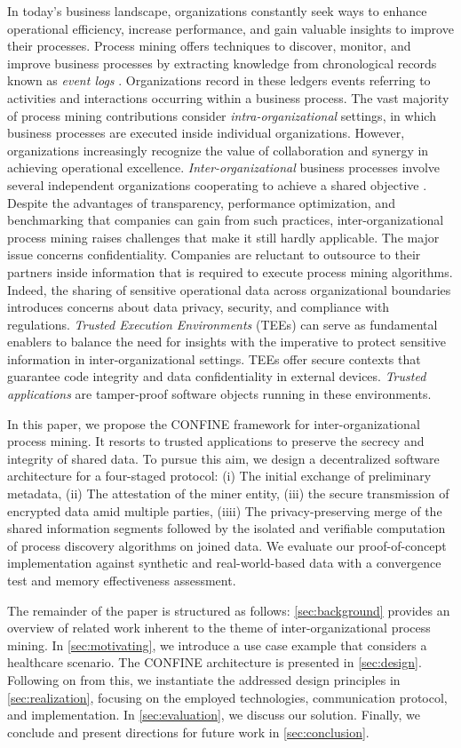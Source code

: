 In today's business landscape, organizations constantly seek ways to enhance operational efficiency, increase performance, and gain valuable insights to improve their processes. Process mining offers techniques to discover, monitor, and improve business processes by extracting knowledge from chronological records known as \textit{event logs} \cite{van2012process}. Organizations record in these ledgers events referring to activities and interactions occurring within a business process. The vast majority of process mining contributions consider \textit{intra-organizational} settings, in which business processes are executed inside individual organizations. However, organizations increasingly recognize the value of collaboration and synergy in achieving operational excellence. \textit{Inter-organizational} business processes involve several independent organizations cooperating to achieve a shared objective \cite{van2011intra}. Despite the advantages of transparency, performance optimization, and benchmarking that companies can gain from such practices, inter-organizational process mining raises challenges that make it still hardly applicable. The major issue concerns confidentiality. Companies are reluctant to outsource to their partners inside information that is required to execute process mining algorithms. Indeed, the sharing of sensitive operational data across organizational boundaries introduces concerns about data privacy, security, and compliance with regulations. \textit{Trusted Execution Environments} (TEEs) can serve as fundamental enablers to balance the need for insights with the imperative to protect sensitive information in inter-organizational settings. TEEs offer secure contexts that guarantee code integrity and data confidentiality in external devices. \textit{Trusted applications} are tamper-proof software objects running in these environments. 

In this paper, we propose the CONFINE framework for inter-organizational process mining. It resorts to trusted applications to preserve the secrecy and integrity of shared data. To pursue this aim, we design a decentralized software architecture for a four-staged protocol: (i) The initial exchange of preliminary metadata, (ii) The attestation of the miner entity, (iii) the secure transmission of encrypted data amid multiple parties, (iiii) The privacy-preserving merge of the shared information segments followed by the isolated and verifiable computation of process discovery algorithms on joined data.
We evaluate our proof-of-concept implementation against synthetic and real-world-based data with a convergence test and memory effectiveness assessment.

The remainder of the paper is structured as follows: \cref{sec:background} provides an overview of related work inherent to the theme of inter-organizational process mining. In \cref{sec:motivating}, we introduce a use case example that considers a healthcare scenario. The CONFINE architecture is presented in \cref{sec:design}. Following on from this, we instantiate the addressed design principles in \cref{sec:realization}, focusing on the employed technologies, communication protocol, and implementation. In \cref{sec:evaluation}, we discuss our solution. Finally, we conclude and present directions for future work in \cref{sec:conclusion}.
